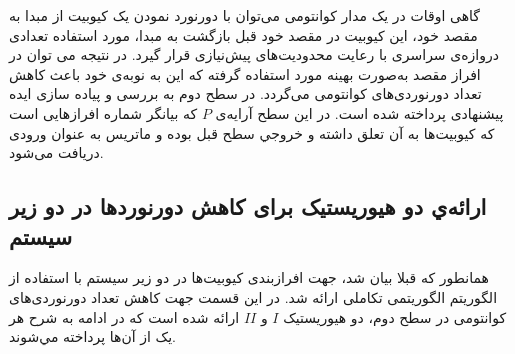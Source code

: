 گاهی اوقات در یک مدار کوانتومی می‌توان با دورنورد نمودن یک کیوبیت از مبدا به مقصد خود، این کیوبیت در مقصد خود قبل بازگشت به مبدا، مورد استفاده تعدادی دروازه‌ی سراسری با رعایت محدودیت‌های پیش‌نیازی قرار گیرد. در نتیجه می توان در افراز مقصد به‌صورت بهینه مورد استفاده گرفته که این به نوبه‌ی خود باعث کاهش تعداد دورنوردی‌های کوانتومی می‌گردد. در سطح دوم به بررسی و پیاده سازی ایده پیشنهادی پرداخته شده است.
در این سطح آرایه‌ی $P$ که بیانگر شماره‌ افرازهایی است که کیوبیت‌ها به آن تعلق داشته و خروجي سطح قبل بوده و ماتریس  به عنوان ورودی دریافت می‌شود.
\subsection{ارائه‌ي دو هیوریستیک برای كاهش دورنوردها در دو زیر سیستم}

همانطور که قبلا بیان شد، جهت افرازبندی کیوبیت‌ها در دو زیر سیستم با استفاده از الگوریتم  الگوریتمی تکاملی ارائه شد. در این قسمت جهت کاهش تعداد دورنوردی‌های کوانتومی در سطح دوم، دو هیوریستیک $I$ و $II$ ارائه شده است که در ادامه به شرح هر یک از آن‌ها پرداخته مي‌شوند.

